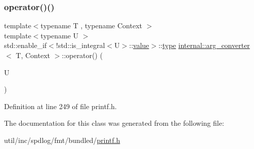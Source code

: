 \subsubsection{\texorpdfstring{operator()()}{operator()()}\hspace{0.1cm}{\footnotesize\ttfamily [3/3]}}
{\footnotesize\ttfamily template$<$typename T , typename Context $>$ \\
template$<$typename U $>$ \\
std\+::enable\+\_\+if$<$!std\+::is\+\_\+integral$<$U$>$\+::\hyperlink{classinternal_1_1value}{value}$>$\+::\hyperlink{namespaceinternal_a8661864098ac0acff9a6dd7e66f59038}{type} \hyperlink{classinternal_1_1arg__converter}{internal\+::arg\+\_\+converter}$<$ T, Context $>$\+::operator() (\begin{DoxyParamCaption}\item[{U}]{ }\end{DoxyParamCaption})\hspace{0.3cm}{\ttfamily [inline]}}



Definition at line 249 of file printf.\+h.



The documentation for this class was generated from the following file\+:\begin{DoxyCompactItemize}
\item 
util/inc/spdlog/fmt/bundled/\hyperlink{printf_8h}{printf.\+h}\end{DoxyCompactItemize}
